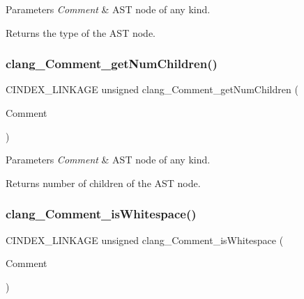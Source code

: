 \begin{DoxyParams}{Parameters}
{\em Comment} & A\+ST node of any kind.\\
\hline
\end{DoxyParams}
\begin{DoxyReturn}{Returns}
the type of the A\+ST node. 
\end{DoxyReturn}
\mbox{\label{group__CINDEX__COMMENT_gaad4eba69493735a4db462bb4b5bed97a}} 
\subsubsection{\texorpdfstring{clang\+\_\+\+Comment\+\_\+get\+Num\+Children()}{clang\_Comment\_getNumChildren()}}
{\footnotesize\ttfamily C\+I\+N\+D\+E\+X\+\_\+\+L\+I\+N\+K\+A\+GE unsigned clang\+\_\+\+Comment\+\_\+get\+Num\+Children (\begin{DoxyParamCaption}\item[{\mbox{\hyperlink{structCXComment}{C\+X\+Comment}}}]{Comment }\end{DoxyParamCaption})}


\begin{DoxyParams}{Parameters}
{\em Comment} & A\+ST node of any kind.\\
\hline
\end{DoxyParams}
\begin{DoxyReturn}{Returns}
number of children of the A\+ST node. 
\end{DoxyReturn}
\mbox{\label{group__CINDEX__COMMENT_ga1193c1dc798aecad92cb30cea78bf71e}} 
\subsubsection{\texorpdfstring{clang\+\_\+\+Comment\+\_\+is\+Whitespace()}{clang\_Comment\_isWhitespace()}}
{\footnotesize\ttfamily C\+I\+N\+D\+E\+X\+\_\+\+L\+I\+N\+K\+A\+GE unsigned clang\+\_\+\+Comment\+\_\+is\+Whitespace (\begin{DoxyParamCaption}\item[{\mbox{\hyperlink{structCXComment}{C\+X\+Comment}}}]{Comment }\end{DoxyParamCaption})}



